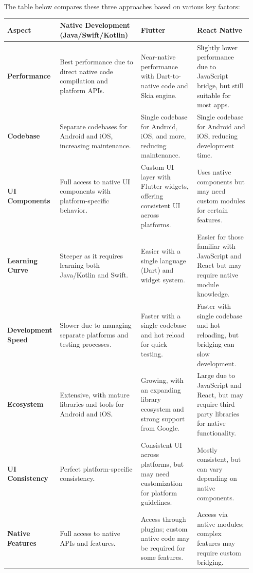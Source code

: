 \documentclass[12pt,a4paper]{report}
\begin{document}
The table below compares these three approaches based on various key factors:

\begin{table}
\centering
\begin{tabular}{|p{3cm}|p{4cm}|p{4cm}|p{4cm}|}
\hline
\textbf{Aspect} & \textbf{Native Development (Java/Swift/Kotlin)} & \textbf{Flutter} & \textbf{React Native} \\ \hline
\textbf{Performance} & Best performance due to direct native code compilation and platform APIs. & Near-native performance with Dart-to-native code and Skia engine. & Slightly lower performance due to JavaScript bridge, but still suitable for most apps. \\ \hline
\textbf{Codebase} & Separate codebases for Android and iOS, increasing maintenance. & Single codebase for Android, iOS, and more, reducing maintenance. & Single codebase for Android and iOS, reducing development time. \\ \hline
\textbf{UI Components} & Full access to native UI components with platform-specific behavior. & Custom UI layer with Flutter widgets, offering consistent UI across platforms. & Uses native components but may need custom modules for certain features. \\ \hline
\textbf{Learning Curve} & Steeper as it requires learning both Java/Kotlin and Swift. & Easier with a single language (Dart) and widget system. & Easier for those familiar with JavaScript and React but may require native module knowledge. \\ \hline
\textbf{Development Speed} & Slower due to managing separate platforms and testing processes. & Faster with a single codebase and hot reload for quick testing. & Faster with single codebase and hot reloading, but bridging can slow development. \\ \hline
\textbf{Ecosystem} & Extensive, with mature libraries and tools for Android and iOS. & Growing, with an expanding library ecosystem and strong support from Google. & Large due to JavaScript and React, but may require third-party libraries for native functionality. \\ \hline
\textbf{UI Consistency} & Perfect platform-specific consistency. & Consistent UI across platforms, but may need customization for platform guidelines. & Mostly consistent, but can vary depending on native components. \\ \hline
\textbf{Native Features} & Full access to native APIs and features. & Access through plugins; custom native code may be required for some features. & Access via native modules; complex features may require custom bridging. \\ \hline

\end{tabular}
\end{table}
\end{document}
